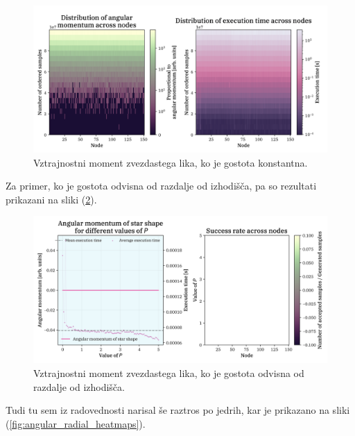 \documentclass[a4paper]{article}
\begin{document}
\begin{figure}[H]
    \centering
    \includegraphics[width=\textwidth]{../StarShapes/Images/angular_const_heatmaps.png}
    \caption{Vztrajnostni moment zvezdastega lika, ko je gostota konstantna.}
    \label{fig:angular_const_heatmaps}
\end{figure}

Za primer, ko je gostota odvisna od razdalje od izhodišča, pa so rezultati prikazani na sliki (\ref{fig:angular_radial}).

\begin{figure}[H]
    \centering
    \includegraphics[width=\textwidth]{../StarShapes/Images/angular_radial.png}
    \caption{Vztrajnostni moment zvezdastega lika, ko je gostota odvisna od razdalje od izhodišča.}
    \label{fig:angular_radial}
\end{figure}

Tudi tu sem iz radovednosti narisal še raztros po jedrih, kar je prikazano na sliki (\ref{fig:angular_radial_heatmaps}).
\end{document}
